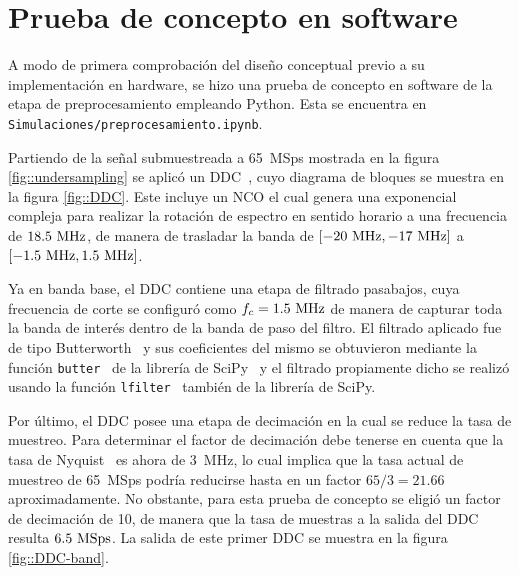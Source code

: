 \documentclass[../../main.tex]{subfiles}
\begin{document}



\section{Prueba de concepto en software}
A modo de primera comprobación del diseño conceptual previo a su implementación en hardware, se hizo una prueba de concepto en software de la etapa de preprocesamiento empleando Python. 
Esta se encuentra en \texttt{Simulaciones/preprocesamiento.ipynb}. 

Partiendo de la señal submuestreada a 65~MSps mostrada en la figura \ref{fig::undersampling} se aplicó un DDC~\cite{DDC}, cuyo diagrama de bloques se muestra en la figura \ref{fig::DDC}. 
Este incluye un NCO el cual genera una exponencial compleja para realizar la rotación de espectro en sentido horario a una frecuencia de $18.5~\textrm{MHz}$, de manera de trasladar la banda de $[-20~\textrm{MHz}, -17~\textrm{MHz}]$ a $[-1.5~\textrm{MHz}, 1.5~\textrm{MHz}]$. 

Ya en banda base, el DDC contiene una etapa de filtrado pasabajos, cuya frecuencia de corte se configuró como $f_c = 1.5~\textrm{MHz}$ de manera de capturar toda la banda de interés dentro de la banda de paso del filtro. El filtrado aplicado fue de tipo Butterworth~\cite{Butterworth} y sus coeficientes del mismo se obtuvieron mediante la función \texttt{butter}~\cite{butter} de la librería de SciPy~\cite{scipy} y el filtrado propiamente dicho se realizó usando la función \texttt{lfilter}~\cite{lfilter} también de la librería de SciPy. 

Por último, el DDC posee una etapa de decimación en la cual se reduce la tasa de muestreo. Para determinar el factor de decimación debe tenerse en cuenta que la tasa de Nyquist~\cite{Nyquist-rate} es ahora de 3~MHz, lo cual implica que la tasa actual de muestreo de 65~MSps podría reducirse hasta en un factor $65/3 = 21.66$ aproximadamente. 
No obstante, para esta prueba de concepto se eligió un factor de decimación de 10, de manera que la tasa de muestras a la salida del DDC resulta $6.5~\textrm{MSps}$. La salida de este primer DDC se muestra en la figura \ref{fig::DDC-band}.
\end{document}

